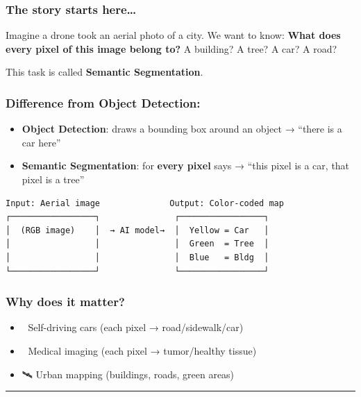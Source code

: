 \documentclass[11pt]{article}
\providecommand{\tightlist}{%
      \setlength{\itemsep}{0pt}\setlength{\parskip}{0pt}}
\begin{document}
\subsubsection{The story starts
here\ldots{}}\label{the-story-starts-here}

Imagine a drone took an aerial photo of a city. We want to know:
\textbf{What does every pixel of this image belong to?} A building? A
tree? A car? A road?

This task is called \textbf{Semantic Segmentation}.

\subsubsection{Difference from Object
Detection:}\label{difference-from-object-detection}

\begin{itemize}
\tightlist
\item
  \textbf{Object Detection}: draws a bounding box around an object →
  ``there is a car here''
\item
  \textbf{Semantic Segmentation}: for \textbf{every pixel} says → ``this
  pixel is a car, that pixel is a tree''
\end{itemize}

\begin{verbatim}
Input: Aerial image              Output: Color-coded map
┌─────────────────┐               ┌─────────────────┐
│  (RGB image)    │  → AI model→  │  Yellow = Car   │
│                 │               │  Green  = Tree  │
│                 │               │  Blue   = Bldg  │
└─────────────────┘               └─────────────────┘
\end{verbatim}

\subsubsection{Why does it matter?}\label{why-does-it-matter}

\begin{itemize}
\tightlist
\item
  🚗 Self-driving cars (each pixel → road/sidewalk/car)
\item
  🏥 Medical imaging (each pixel → tumor/healthy tissue)
\item
  🛰️ Urban mapping (buildings, roads, green areas)
\end{itemize}

    \begin{center}\rule{0.5\linewidth}{0.5pt}\end{center}
\end{document}
